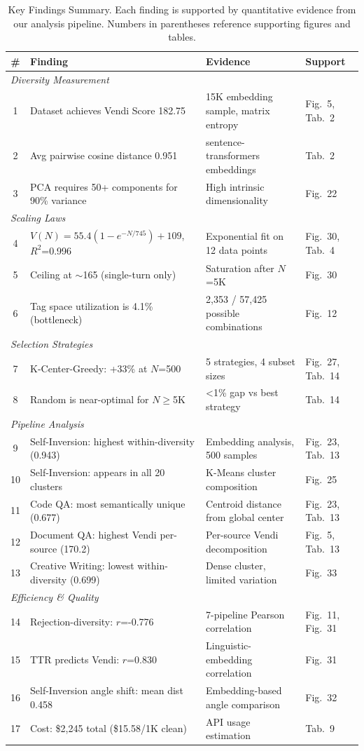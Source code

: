 \begin{table}[t]
\centering
\caption{Key Findings Summary. Each finding is supported by quantitative evidence from our analysis pipeline. Numbers in parentheses reference supporting figures and tables.}
\label{tab:key_findings}
\small
\begin{tabular}{clll}
\toprule
\textbf{\#} & \textbf{Finding} & \textbf{Evidence} & \textbf{Support} \\
\midrule
\multicolumn{4}{l}{\textit{Diversity Measurement}} \\
1 & Dataset achieves Vendi Score 182.75 & 15K embedding sample, matrix entropy & Fig.~5, Tab.~2 \\
2 & Avg pairwise cosine distance 0.951 & sentence-transformers embeddings & Tab.~2 \\
3 & PCA requires 50+ components for 90\% variance & High intrinsic dimensionality & Fig.~22 \\
\midrule
\multicolumn{4}{l}{\textit{Scaling Laws}} \\
4 & $V(N) = 55.4(1-e^{-N/745}) + 109$, $R^2$=0.996 & Exponential fit on 12 data points & Fig.~30, Tab.~4 \\
5 & Ceiling at $\sim$165 (single-turn only) & Saturation after $N$=5K & Fig.~30 \\
6 & Tag space utilization is 4.1\% (bottleneck) & 2,353 / 57,425 possible combinations & Fig.~12 \\
\midrule
\multicolumn{4}{l}{\textit{Selection Strategies}} \\
7 & K-Center-Greedy: +33\% at $N$=500 & 5 strategies, 4 subset sizes & Fig.~27, Tab.~14 \\
8 & Random is near-optimal for $N \geq$5K & <1\% gap vs best strategy & Tab.~14 \\
\midrule
\multicolumn{4}{l}{\textit{Pipeline Analysis}} \\
9 & Self-Inversion: highest within-diversity (0.943) & Embedding analysis, 500 samples & Fig.~23, Tab.~13 \\
10 & Self-Inversion: appears in all 20 clusters & K-Means cluster composition & Fig.~25 \\
11 & Code QA: most semantically unique (0.677) & Centroid distance from global center & Fig.~23, Tab.~13 \\
12 & Document QA: highest Vendi per-source (170.2) & Per-source Vendi decomposition & Fig.~5, Tab.~13 \\
13 & Creative Writing: lowest within-diversity (0.699) & Dense cluster, limited variation & Fig.~33 \\
\midrule
\multicolumn{4}{l}{\textit{Efficiency \& Quality}} \\
14 & Rejection-diversity: $r$=-0.776 & 7-pipeline Pearson correlation & Fig.~11, Fig.~31 \\
15 & TTR predicts Vendi: $r$=0.830 & Linguistic-embedding correlation & Fig.~31 \\
16 & Self-Inversion angle shift: mean dist 0.458 & Embedding-based angle comparison & Fig.~32 \\
17 & Cost: \$2,245 total (\$15.58/1K clean) & API usage estimation & Tab.~9 \\
\bottomrule
\end{tabular}
\end{table}
